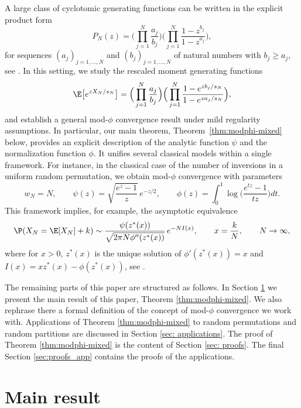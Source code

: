 \documentclass[11pt,a4paper]{scrartcl}
\numberwithin{equation}{section}
\theoremstyle{plain}
\theoremstyle{definition}
\theoremstyle{remark}
\begin{document}
A large class of cyclotomic generating functions can be written in the explicit product form
$$
P_N(z)= \Big(\prod_{j=1}^N\frac{a_j}{b_j}\Big)\Big(\prod_{j=1}^N\frac{1-z^{b_j}}{1-z^{a_j}}\Big),
$$
for sequences $(a_j)_{j=1,\ldots,N}$ and $(b_j)_{j=1,\ldots,N}$ of natural numbers with $b_j\ge a_j$, see \cite{hwang2015limit}. In this setting, we study the rescaled moment generating functions
$$
\E\big[e^{z X_N/s_N}\big]
= \Big(\prod_{j=1}^{N}\frac{a_j}{b_j}\Big)
\Big(\prod_{j=1}^{N}\frac{1 - e^{z b_j/s_N}}{1 - e^{z a_j/s_N}}\Big),
$$
and establish a general mod-$\phi$ convergence result under mild regularity assumptions.
In particular, our main theorem, Theorem~\ref{thm:modphi-mixed} below, provides an explicit description of the analytic function $\psi$ and the normalization function $\phi$. It unifies several classical models within a single framework. For instance, in the classical case of the number of inversions in a uniform random permutation, we obtain mod-$\phi$ convergence with parameters
$$
w_N=N,\qquad \psi(z) = \sqrt{\frac{e^z - 1}{z}}\, e^{-z/2},
\qquad
\phi(z) = \int_0^1 \log\Big(\frac{e^{tz}-1}{tz}\Big) dt.
$$
This framework implies, for example, the asymptotic equivalence
$$
\P(X_N = \E[X_N] + k) \sim {\psi(z^*(x))\over\sqrt{2\pi N\phi''(z^*(x))}}\,e^{-NI(x)},\qquad x={k\over N},\qquad N\to\infty,
$$
where for $x>0$, $z^*(x)$ is the unique solution of $\phi'(z^*(x))=x$ and $I(x)=xz^*(x)-\phi(z^*(x))$, see \cite[Theorem 3.4]{feray2018mod}.

The remaining parts of this paper are structured as follows. In Section \ref{sec:MainResult} we present the main result of this paper, Theorem \ref{thm:modphi-mixed}. We also rephrase there a formal definition of the concept of mod-$\phi$ convergence we work with. Applications of Theorem \ref{thm:modphi-mixed} to random permutations and random partitions are discussed in Section \ref{sec: applications}. The proof of Theorem \ref{thm:modphi-mixed} is the content of Section \ref{sec: proofs}. The final Section \ref{sec:proofs_app} contains the proofs of the applications.


\section{Main result}\label{sec:MainResult}
\end{document}
